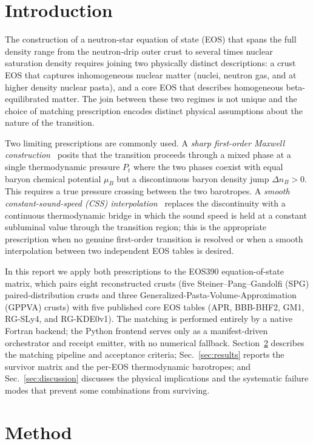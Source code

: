 \documentclass[aps,prc,reprint,notitlepage]{revtex4-2}
\begin{document}
\section{Introduction}\label{sec:intro}

The construction of a neutron-star equation of state (EOS) that spans the
full density range from the neutron-drip outer crust to several times
nuclear saturation density requires joining two physically distinct
descriptions: a crust EOS that captures inhomogeneous nuclear matter
(nuclei, neutron gas, and at higher density nuclear pasta), and a core EOS
that describes homogeneous beta-equilibrated matter.  The join between
these two regimes is not unique and the choice of matching prescription
encodes distinct physical assumptions about the nature of the transition.

Two limiting prescriptions are commonly used.  A \emph{sharp first-order
Maxwell construction}~\cite{Seidov1967,Haensel1989} posits that the
transition proceeds through a mixed phase at a single thermodynamic
pressure $P_t$ where the two phases coexist with equal baryon chemical
potential $\mu_B$ but a discontinuous baryon density jump $\Delta n_B > 0$.
This requires a true pressure crossing between the two barotropes.  A
\emph{smooth constant-sound-speed (CSS) interpolation}~\cite{Alford2013}
replaces the discontinuity with a continuous thermodynamic bridge in which
the sound speed is held at a constant subluminal value through the
transition region; this is the appropriate prescription when no genuine
first-order transition is resolved or when a smooth interpolation between
two independent EOS tables is desired.

In this report we apply both prescriptions to the EOS390 equation-of-state
matrix, which pairs eight reconstructed crusts (five
Steiner--Pang--Gandolfi (SPG) paired-distribution crusts and three
Generalized-Pasta-Volume-Approximation (GPPVA) crusts) with five published
core EOS tables (APR, BBB-BHF2, GM1, RG-SLy4, and RG-KDE0v1).  The matching
is performed entirely by a native Fortran backend; the Python frontend
serves only as a manifest-driven orchestrator and receipt emitter, with no
numerical fallback.  Section~\ref{sec:method} describes the matching
pipeline and acceptance criteria; Sec.~\ref{sec:results} reports the
survivor matrix and the per-EOS thermodynamic barotropes; and
Sec.~\ref{sec:discussion} discusses the physical implications and the
systematic failure modes that prevent some combinations from surviving.

\section{Method}\label{sec:method}
\end{document}
